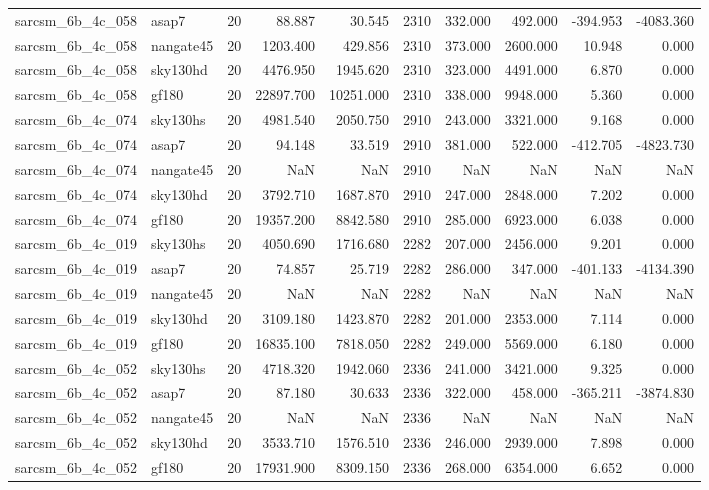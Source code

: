 \begin{tabular}{llrrrrrrrr}
sarcsm\_6b\_4c\_058 & asap7 & 20 & 88.887 & 30.545 & 2310 & 332.000 & 492.000 & -394.953 & -4083.360 \\
sarcsm\_6b\_4c\_058 & nangate45 & 20 & 1203.400 & 429.856 & 2310 & 373.000 & 2600.000 & 10.948 & 0.000 \\
sarcsm\_6b\_4c\_058 & sky130hd & 20 & 4476.950 & 1945.620 & 2310 & 323.000 & 4491.000 & 6.870 & 0.000 \\
sarcsm\_6b\_4c\_058 & gf180 & 20 & 22897.700 & 10251.000 & 2310 & 338.000 & 9948.000 & 5.360 & 0.000 \\
sarcsm\_6b\_4c\_074 & sky130hs & 20 & 4981.540 & 2050.750 & 2910 & 243.000 & 3321.000 & 9.168 & 0.000 \\
sarcsm\_6b\_4c\_074 & asap7 & 20 & 94.148 & 33.519 & 2910 & 381.000 & 522.000 & -412.705 & -4823.730 \\
sarcsm\_6b\_4c\_074 & nangate45 & 20 & NaN & NaN & 2910 & NaN & NaN & NaN & NaN \\
sarcsm\_6b\_4c\_074 & sky130hd & 20 & 3792.710 & 1687.870 & 2910 & 247.000 & 2848.000 & 7.202 & 0.000 \\
sarcsm\_6b\_4c\_074 & gf180 & 20 & 19357.200 & 8842.580 & 2910 & 285.000 & 6923.000 & 6.038 & 0.000 \\
sarcsm\_6b\_4c\_019 & sky130hs & 20 & 4050.690 & 1716.680 & 2282 & 207.000 & 2456.000 & 9.201 & 0.000 \\
sarcsm\_6b\_4c\_019 & asap7 & 20 & 74.857 & 25.719 & 2282 & 286.000 & 347.000 & -401.133 & -4134.390 \\
sarcsm\_6b\_4c\_019 & nangate45 & 20 & NaN & NaN & 2282 & NaN & NaN & NaN & NaN \\
sarcsm\_6b\_4c\_019 & sky130hd & 20 & 3109.180 & 1423.870 & 2282 & 201.000 & 2353.000 & 7.114 & 0.000 \\
sarcsm\_6b\_4c\_019 & gf180 & 20 & 16835.100 & 7818.050 & 2282 & 249.000 & 5569.000 & 6.180 & 0.000 \\
sarcsm\_6b\_4c\_052 & sky130hs & 20 & 4718.320 & 1942.060 & 2336 & 241.000 & 3421.000 & 9.325 & 0.000 \\
sarcsm\_6b\_4c\_052 & asap7 & 20 & 87.180 & 30.633 & 2336 & 322.000 & 458.000 & -365.211 & -3874.830 \\
sarcsm\_6b\_4c\_052 & nangate45 & 20 & NaN & NaN & 2336 & NaN & NaN & NaN & NaN \\
sarcsm\_6b\_4c\_052 & sky130hd & 20 & 3533.710 & 1576.510 & 2336 & 246.000 & 2939.000 & 7.898 & 0.000 \\
sarcsm\_6b\_4c\_052 & gf180 & 20 & 17931.900 & 8309.150 & 2336 & 268.000 & 6354.000 & 6.652 & 0.000 \\

\end{tabular}

